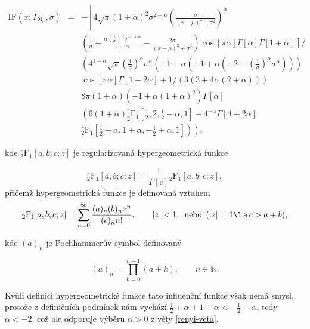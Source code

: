 \begin{eqnarray}
\mathrm{IF}(x;T_{\mathfrak{R}_\alpha},\sigma) &=& -\left[4 \sqrt{\pi } (1+\alpha )^2 \sigma ^{2+\alpha } \left(\frac{\sigma }{(x-\mu )^2+\sigma ^2}\right)^{\alpha} \right. \nonumber\\
&&\left(\frac{1}{\sigma }+\frac{\alpha  \left(\frac{1}{\sigma }\right)^{\alpha } \sigma ^{-1+\alpha }}{1+\alpha }-\frac{2 \sigma }{(x-\mu )^2+\sigma ^2}\right) \left. \cos[\pi  \alpha ] \Gamma[\alpha ] \Gamma[1+\alpha ]  \frac{}{} \right] / \nonumber \\ %
&&\left(4^{1-\alpha } \sqrt{\pi } \left(\frac{1}{\sigma }\right)^{\alpha } \sigma ^{\alpha } \left(-1+\alpha  \left(-1+\alpha  \left(-2+\left(\frac{1}{\sigma }\right)^{\alpha } \sigma ^{\alpha }\right)\right)\right) \right.\nonumber \\ 
&&\left. \cos[\pi  \alpha ] \Gamma[1+2 \alpha ]+1/(3 (3+4 \alpha  (2+\alpha )))\right. \nonumber \\
&& 8 \pi  (1+\alpha ) \left(-1+\alpha  (1+\alpha )^2\right) \Gamma[\alpha ] \nonumber \\
&& \left(6 (1+\alpha ) ^r_2\mathrm{F}_1\left[\frac{1}{2},2,\frac{1}{2}-\alpha ,1\right]-4^{-\alpha } \Gamma[4+2 \alpha ] \right. \nonumber \\
&& \left. \left. ^r_2\mathrm{F}_1\left[\frac{1}{2}+\alpha ,1+\alpha ,-\frac{1}{2}+\alpha ,1\right]\right)\right),
\end{eqnarray}

\noindent kde $^r_2\mathrm{F}_1[a,b;c;z]$ je regularizovaná hypergeometrická funkce 

\begin{equation}
	^r_2\mathrm{F}_1[a,b;c;z] = {\frac{1}{\Gamma[c]}} {_2\mathrm{F}_1}[a,b;c;z],
\end{equation}
přičemž hypergeometrická funkce je definovaná vztahem
\begin{equation}
	{_2\mathrm{F}_1}[a,b;c;z]=\sum _{n=0}^{\infty } \frac{(a)_n (b)_n z^n}{ (c)_n n!}, \qquad |z|<1, \, \text{ nebo } \, (|z|=1\l  \,\text{a} \,  c>a+b),
\end{equation}

\noindent kde $(a)_n$ je Pochhammerův symbol definovaný

\begin{equation}
(a)_n=\prod _{k=0}^{n-1} (a+k), \qquad n \in \mathbb{N}.
\end{equation}

\noindent Kvůli definici hypergeometrické funkce tato influenční funkce však nemá smysl, protože z definičních podmínek nám vychází $\frac{1}{2}+\alpha  + 1+\alpha < -\frac{1}{2}+\alpha $, tedy $\alpha < -2$, což ale odporuje výběru $\alpha>0$ z věty \ref{renyi-veta}. 

